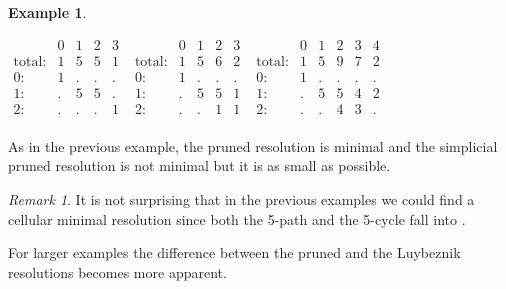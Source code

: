 \documentclass[12pt]{amsart}
\theoremstyle{definition}
\newtheorem{example}[theorem]{Example}
\theoremstyle{remark}
\newtheorem{remark}[theorem]{Remark}
\numberwithin{equation}{section}
\newcommand{\phil}[1]{{\color{red} \sf $\star\star$ Philippe: [#1]}}
\begin{document}
\begin{example}
\begin{center}
{\small
$\begin{matrix}
&0&1&2&3\\\text{total:}&1&5&5& 1\\\text{0:}&1&\text{.}&\text{.}&\text{.}\\\text{1:}&\text{.}&5&5&\text{.}\\\text{2:}&\text{.}&\text{.}&\text{.}&1\\\end{matrix}
$
\hfill
$\begin{matrix}
&0&1&2&3\\
\text{total:}&1&5&6&2\\
\text{0:}&1&\text{.}&\text{.}&\text{.}\\
\text{1:}&\text{.}&5&5&1\\
\text{2:}&\text{.}&\text{.}&1&1\\
\end{matrix}$
\hfill
$\begin{matrix}
&0&1&2&3&4\\
\text{total:}&1&5&9&7&2\\
\text{0:}&1&\text{.}&\text{.}&\text{.}&\text{.}\\
\text{1:}&\text{.}&5&5&4&2\\
\text{2:}&\text{.}&\text{.}&4&3&\text{.}\\
\end{matrix}$
}
\hskip 1cm
\end{center}
As in the previous example, the pruned resolution is minimal and the simplicial pruned resolution is not minimal but it is as small as possible.
%
%
%
\end{example}

\begin{remark}
It is not surprising that in the previous examples we could find a cellular minimal resolution since both
 the 5-path and the 5-cycle fall into \cite[Example 1.7]{BS}.
\end{remark}

\vskip 2mm

For larger examples the difference  between the pruned and the Luybeznik resolutions
becomes more apparent.

\vskip 2mm
\end{document}
